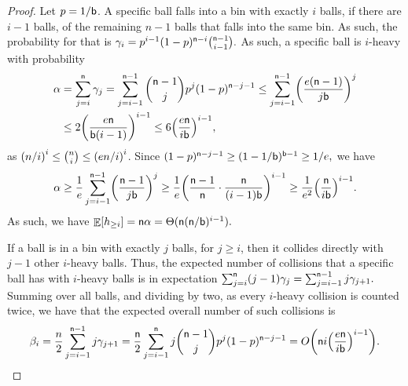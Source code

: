\begin{proof}
    Let $p = 1/\mathsf{b}$. A specific ball falls into a bin with exactly
    $i$ balls, if there are $i-1$ balls, of the remaining $n-1$ balls
    that falls into the same bin. As such, the probability for that is
    \begin{math}
        \gamma_i = p^{i-1}(1-p)^{\mathsf{n}-i} \binom{\mathsf{n}-1}{i-1}.
    \end{math}
    As such, a specific ball is $i$-heavy with probability
    \begin{align*}
        \alpha%
        &=%
        \sum_{j=i}^\nballs \gamma_j %
        =%
        \sum_{j=i-1}^{\nballs-1} \binom{\nballs-1}{j}
        p^j(1-p)^{\nballs-j-1}%
        \leq%
        \sum_{j=i-1}^{\nballs-1}  \pth{\frac{e(\nballs-1)}{j \nbins}}^j%
        \\&
        \leq%
        2 \pth{\frac{e \nballs}{\nbins (i-1)}}^{i-1}
        \leq%
        6 \pth{\frac{e \nballs}{i \nbins}}^{i-1},
    \end{align*}
    as $\pth{ n/i}^i \leq \binom{n}{i} \leq \pth{ e n/i}^i$. Since
    \begin{math}
        (1-p)^{\nballs-j-1}%
        \geq%
        (1-1/\nbins)^{\nbins-1}%
        \geq%
        1/e,
    \end{math}
    we have
    \begin{equation*}
      \alpha%
      \geq%
        \frac{1}{e}
        \sum_{j=i-1}^{\nballs-1}  \pth{\frac{\nballs-1}{j \nbins}}^j\\%
      \geq%
        \frac{1}{e}
        \pth{\frac{\nballs-1}{\nballs}\cdot\frac{\nballs}{(i-1) \nbins}}^{i-1}%
        \geq%
        \frac{1}{e^2}
        \pth{\frac{\nballs}{i \nbins}}^{i-1}.%
    \end{equation*}
    As such, we have
    \begin{math}
        \mathop{\mathbb{E}}\!\left[ {h_{\geq i}} \right] = \mathsf{n} \alpha = \Theta(
        \mathsf{n}(\mathsf{n}/\mathsf{b})^{i-1} ).
    \end{math}

    If a ball is in a bin with exactly $j$ balls, for $j \geq i$, then
    it collides directly with $j-1$ other $i$-heavy balls. Thus, the
    expected number of collisions that a specific ball has with
    $i$-heavy balls is in expectation
    \begin{math}
        \sum_{j=i}^{\nballs} (j-1) \gamma_j%
        =%
        \sum_{j=i-1}^{\nballs-1} j \gamma_{j+1}.
    \end{math}
    Summing over all balls, and dividing by two, as every $i$-heavy
    collision is counted twice, we have that the expected overall
    number of such collisions is
    \begin{equation*}
        \beta_i%
        =%
        \frac{n}{2}
        \sum_{j=i-1}^{\nballs-1} j \gamma_{j+1}\\
        =%
        \frac{\nballs}{2} \sum_{j=i-1}^{\nballs}
        j \binom{\nballs-1}{j} p^j(1-p)^{\nballs-j-1}%
        =%
        O \pth{ \nballs i \pth{\frac{e \nballs}{i \nbins}}^{i-1}}.
    \end{equation*}
\end{proof}



